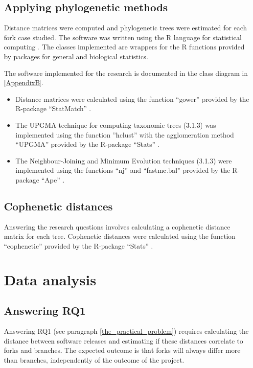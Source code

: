 

\subsection{Applying phylogenetic methods}
Distance matrices were computed and phylogenetic trees were estimated for each fork case studied. The software was written using the R language for statistical computing \citep{RDevelopmentCoreTeam2008a}. The classes implemented are wrappers for the R functions provided by packages for general and biological statistics. 

The software implemented for the research is documented in the class diagram in \ref{AppendixB}.

\begin{itemize}
\item{Distance matrices were calculated using the function “gower” provided by the R-package “StatMatch” \citep{DOrazio2016}.}

\item{The UPGMA technique for computing taxonomic trees (3.1.3) was implemented using the function ”hclust” with the agglomeration method “UPGMA” provided by the R-package “Stats” \citep[p.1355]{RDevelopmentCoreTeam2008a}.}

\item{The Neighbour-Joining and Minimum Evolution techniques (3.1.3) were implemented using the functions “nj” and “fastme.bal” provided by the R-package “Ape” \citep{Paradis2004a}.}
\end{itemize}

\subsection{Cophenetic distances}
Answering the research questions involves calculating a cophenetic distance matrix for each tree. Cophenetic distances were calculated using the function “cophenetic” provided by the R-package “Stats” \citep[p.1275]{RDevelopmentCoreTeam2008a}.


\section{Data analysis}

\subsection{Answering RQ1}
Answering RQ1 (see paragraph \ref{the_practical_problem}) requires calculating the distance between software releases and estimating if these distances correlate to forks and branches. The expected outcome is that forks will always differ more than branches, independently of the outcome of the project.


